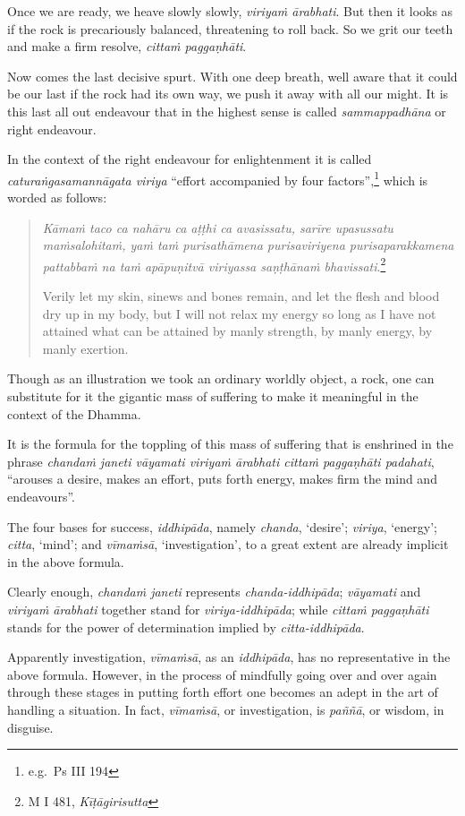 Once we are ready, we heave slowly slowly, \emph{viriyaṁ ārabhati}. But then it looks as if the rock is precariously balanced, threatening to roll back. So we grit our teeth and make a firm resolve, \emph{cittaṁ paggaṇhāti}.

Now comes the last decisive spurt. With one deep breath, well aware that it could be our last if the rock had its own way, we push it away with all our might. It is this last all out endeavour that in the highest sense is called \emph{sammappadhāna} or right endeavour.

In the context of the right endeavour for enlightenment it is called \emph{caturaṅgasamannāgata viriya} ``effort accompanied by four factors'',\footnote{e.g.~Ps III 194} which is worded as follows:

\begin{quote}
\emph{Kāmaṁ taco ca nahāru ca aṭṭhi ca avasissatu, sarīre upasussatu maṁsalohitaṁ, yaṁ taṁ purisathāmena purisaviriyena purisaparakkamena pattabbaṁ na taṁ apāpuṇitvā viriyassa saṇṭhānaṁ bhavissati}.\footnote{M I 481, \emph{Kīṭāgirisutta}}

Verily let my skin, sinews and bones remain, and let the flesh and blood dry up in my body, but I will not relax my energy so long as I have not attained what can be attained by manly strength, by manly energy, by manly exertion.
\end{quote}

Though as an illustration we took an ordinary worldly object, a rock, one can substitute for it the gigantic mass of suffering to make it meaningful in the context of the Dhamma.

It is the formula for the toppling of this mass of suffering that is enshrined in the phrase \emph{chandaṁ janeti vāyamati viriyaṁ ārabhati cittaṁ paggaṇhāti padahati}, ``arouses a desire, makes an effort, puts forth energy, makes firm the mind and endeavours''.

The four bases for success, \emph{iddhipāda}, namely \emph{chanda}, `desire'; \emph{viriya}, `energy'; \emph{citta}, `mind'; and \emph{vīmaṁsā}, `investigation', to a great extent are already implicit in the above formula.

Clearly enough, \emph{chandaṁ janeti} represents \emph{chanda-iddhipāda}; \emph{vāyamati} and \emph{viriyaṁ ārabhati} together stand for \emph{viriya-iddhipāda}; while \emph{cittaṁ paggaṇhāti} stands for the power of determination implied by \emph{citta-iddhipāda}.

Apparently investigation, \emph{vīmaṁsā}, as an \emph{iddhipāda}, has no representative in the above formula. However, in the process of mindfully going over and over again through these stages in putting forth effort one becomes an adept in the art of handling a situation. In fact, \emph{vīmaṁsā}, or investigation, is \emph{paññā}, or wisdom, in disguise.

